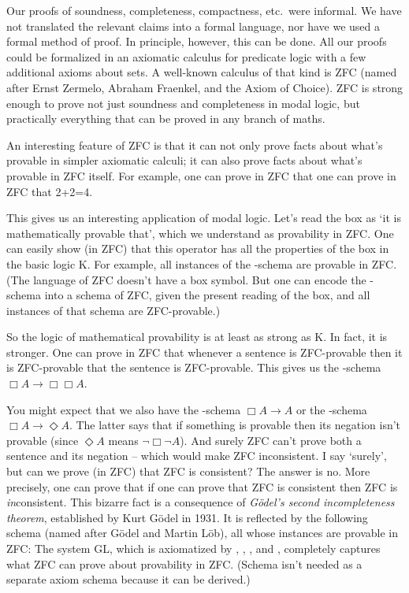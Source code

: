 Our proofs of soundness, completeness, compactness, etc.\ were informal. We have
not translated the relevant claims into a formal language, nor have we used a
formal method of proof. In principle, however, this can be done. All our
proofs could be formalized in an axiomatic calculus for predicate logic with a
few additional axioms about sets. A well-known calculus of that kind is ZFC
(named after Ernst Zermelo, Abraham Fraenkel, and the Axiom of Choice). ZFC is
strong enough to prove not just soundness and completeness in modal logic, but
practically everything that can be proved in any branch of maths.

An interesting feature of ZFC is that it can not only prove facts about what's
provable in simpler axiomatic calculi; it can also prove facts about what's
provable in ZFC itself. For example, one can prove in ZFC that one can prove in
ZFC that 2+2=4.

This gives us  an interesting application of modal logic. Let's read the box as
`it is mathematically provable that', which we understand as provability in ZFC.
One can easily show (in ZFC) that this operator has all the properties of the
box in the basic logic K. For example, all instances of the -schema are
provable in ZFC. (The language of ZFC doesn't have a box symbol. But one can
encode the -schema into a schema of ZFC, given the present reading of the
box, and all instances of that schema are ZFC-provable.)

So the logic of mathematical provability is at least as strong as K. In fact, it
is stronger. One can prove in ZFC that whenever a sentence is ZFC-provable then
it is ZFC-provable that the sentence is ZFC-provable. This gives us the
-schema $\Box A \to \Box\Box A$.

You might expect that we also have the -schema $\Box A \to A$ or the
-schema $\Box A \to \Diamond A$. The latter says that if something is
provable then its negation isn't provable (since $\Diamond A$ means
$\neg\Box\neg A$). And surely ZFC can't prove both a sentence and its negation
-- which would make ZFC inconsistent. I say `surely', but can we
prove (in ZFC) that ZFC is consistent? The answer is no. More precisely, one can
prove that if one can prove that ZFC is consistent then ZFC is
\emph{in}consistent. This bizarre fact is a consequence of \emph{G\"odel's
  second incompleteness theorem}, established by Kurt G\"odel in 1931. It is
reflected by the following schema (named after G\"odel and Martin L\"ob), all
whose instances are provable in ZFC:
%
%
The system GL, which is axiomatized by , , , and ,
completely captures what ZFC can prove about provability in ZFC. (Schema 
isn't needed as a separate axiom schema because it can be derived.)%

